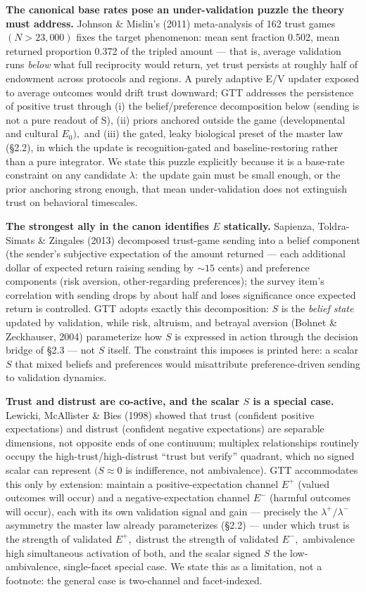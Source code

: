 \documentclass[
]{article}
\begin{document}
\textbf{The canonical base rates pose an under-validation puzzle the
theory must address.} Johnson \& Mislin's (2011) meta-analysis of 162
trust games \((N > 23,000)\) fixes the target phenomenon: mean sent
fraction 0.502, mean returned proportion 0.372 of the tripled amount ---
that is, average validation runs \emph{below} what full reciprocity
would return, yet trust persists at roughly half of endowment across
protocols and regions. A purely adaptive E/V updater exposed to average
outcomes would drift trust downward; GTT addresses the persistence of
positive trust through (i) the belief/preference decomposition below
(sending is not a pure readout of S), (ii) priors anchored outside the
game (developmental and cultural \(E_{0}),\) and (iii) the gated, leaky
biological preset of the master law (§2.2), in which the update is
recognition-gated and baseline-restoring rather than a pure integrator.
We state this puzzle explicitly because it is a base-rate constraint on
any candidate \(\lambda:\) the update gain must be small enough, or the
prior anchoring strong enough, that mean under-validation does not
extinguish trust on behavioral timescales.

\textbf{The strongest ally in the canon identifies \(E\) statically.}
Sapienza, Toldra-Simats \& Zingales (2013) decomposed trust-game sending
into a belief component (the sender's subjective expectation of the
amount returned --- each additional dollar of expected return raising
sending by \(\sim15\) cents) and preference components (risk aversion,
other-regarding preferences); the survey item's correlation with sending
drops by about half and loses significance once expected return is
controlled. GTT adopts exactly this decomposition: \(S\) is the
\emph{belief state} updated by validation, while risk, altruism, and
betrayal aversion (Bohnet \& Zeckhauser, 2004) parameterize how \(S\) is
expressed in action through the decision bridge of §2.3 --- not \(S\)
itself. The constraint this imposes is printed here: a scalar \(S\) that
mixed beliefs and preferences would misattribute preference-driven
sending to validation dynamics.

\textbf{Trust and distrust are co-active, and the scalar \(S\) is a
special case.} Lewicki, McAllister \& Bies (1998) showed that trust
(confident positive expectations) and distrust (confident negative
expectations) are separable dimensions, not opposite ends of one
continuum; multiplex relationships routinely occupy the
high-trust/high-distrust ``trust but verify'' quadrant, which no signed
scalar can represent \((S \approx 0\) is indifference, not ambivalence).
GTT accommodates this only by extension: maintain a positive-expectation
channel \(E^{+}\) (valued outcomes will occur) and a
negative-expectation channel \(E^{-}\) (harmful outcomes will occur),
each with its own validation signal and gain --- precisely the
\(\lambda^{+}/\lambda^{-}\) asymmetry the master law already
parameterizes (§2.2) --- under which trust is the strength of validated
\(E^{+},\) distrust the strength of validated \(E^{-},\) ambivalence
high simultaneous activation of both, and the scalar signed \(S\) the
low-ambivalence, single-facet special case. We state this as a
limitation, not a footnote: the general case is two-channel and
facet-indexed.
\end{document}

